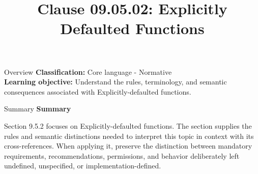 \documentclass[10pt,letterpaper]{article}
\title{Clause 09.05.02: Explicitly Defaulted Functions}
\author{}
\date{}
\begin{document}
\maketitle
\begin{CornellOverviewBox}{Overview}
\textbf{Classification:} Core language - Normative\\[2pt]
\textbf{Learning objective:} Understand the rules, terminology, and semantic consequences associated with Explicitly-defaulted functions.
\end{CornellOverviewBox}\begin{CornellSummaryBox}{Summary}
{\sffamily\bfseries\color{Accent} Summary}\par\vspace{3pt}Section 9.5.2 focuses on Explicitly-defaulted functions. The section supplies the rules and semantic distinctions needed to interpret this topic in context with its cross-references. When applying it, preserve the distinction between mandatory requirements, recommendations, permissions, and behavior deliberately left undefined, unspecified, or implementation-defined.
\end{CornellSummaryBox}
\end{document}
